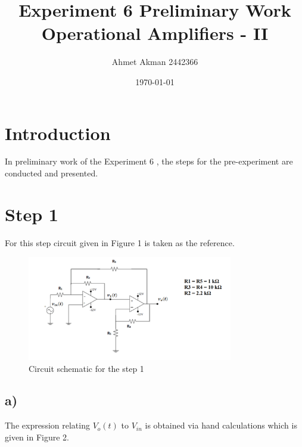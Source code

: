 \documentclass[letterpaper,12pt]{article}
\begin{document}
\title{Experiment 6 Preliminary Work \protect\\ Operational Amplifiers - II}
\author{Ahmet Akman 2442366 \protect\\}
\date{\today}
\maketitle
\newpage
\tableofcontents
\newpage

\section{Introduction} 
In preliminary work of the Experiment 6 , the steps for the pre-experiment are conducted and presented.
\section{Step 1}
For this step circuit given in Figure 1 is taken as the reference.
\begin{figure}[H]
	\centering
   \includegraphics[width=0.8\textwidth]{circuit_1.png}
   \caption{Circuit schematic for the step 1}
\end{figure} 

\subsection{a)}
The expression relating \(V_o(t)\) to \(V_{in}\) is obtained via hand calculations which is given in Figure 2.
\end{document}

